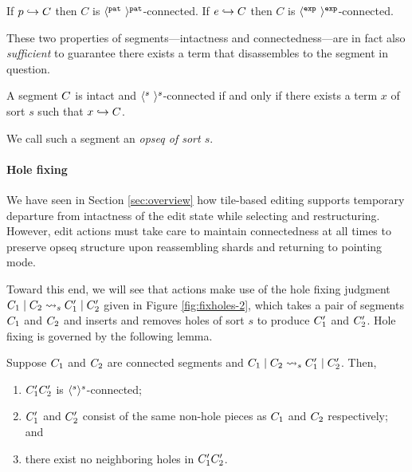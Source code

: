\begin{lemma}
  If $p\hookrightarrow C$ then $C$ is $\langle^{\texttt{pat}}~\rangle^{\texttt{pat}}$-connected.
  If $e\hookrightarrow C$ then $C$ is $\langle^{\texttt{exp}}~\rangle^{\texttt{exp}}$-connected.
\end{lemma}




These two properties of segments---intactness
and connectedness---are in fact also \emph{sufficient} to
guarantee there exists a term that disassembles to
the segment in question.

\begin{theorem} \label{thm:term-parseability}
  A segment $C$ is intact and $\langle^{s}~\rangle^{s}$-connected
  if and only if there exists a term $x$ of sort $s$ such that
  $x\hookrightarrow C$.
\end{theorem}
\noindent
We call such a segment an \emph{opseq of sort $s$}.

\paragraph{Hole fixing}
We have seen in Section \ref{sec:overview} how tile-based
editing supports temporary departure from intactness of
the edit state while selecting and restructuring.
However, edit actions must take care to maintain
connectedness at all times to preserve opseq structure
upon reassembling shards and returning to pointing mode.



Toward this end, we will see that actions make use of the hole fixing judgment
$C_1\mid C_2\rightsquigarrow_{s}C'_1\mid C'_2$
given in Figure \ref{fig:fixholes-2},
which takes a pair of segments $C_1$ and $C_2$
and inserts and removes holes of sort $s$ to produce $C'_1$
and $C'_2$.
Hole fixing is governed by the following lemma.


\begin{lemma}
  Suppose $C_1$ and $C_2$ are connected segments
  and $C_1\mid C_2\rightsquigarrow_{s}C'_1\mid C'_2$.
  Then,
  \begin{enumerate}
    \item $C'_1C'_2$ is $\langle^{s}\rangle^{s}$-connected;
    \item $C'_1$ and $C'_2$ consist of the same non-hole pieces as
        $C_1$ and $C_2$ respectively; and
    \item there exist no neighboring holes in $C'_1C'_2$.
  \end{enumerate}
\end{lemma}


